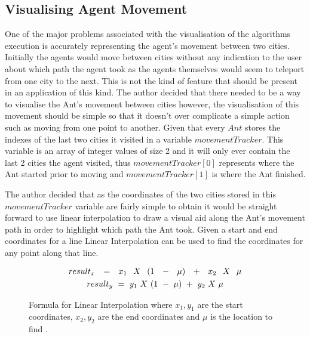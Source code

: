 \subsection{Visualising Agent Movement}
\label{visy}
One of the major problems associated with the visualisation of the algorithms execution is accurately representing the agent’s movement between two cities. Initially the agents would move between cities without any indication to the user about which path the agent took as the agents themselves would seem to teleport from one city to the next. This is not the kind of feature that should be present in an application of this kind. The author decided that there needed to be a way to visualise the Ant’s movement between cities however, the visualisation of this movement should be simple so that it doesn’t over complicate a simple action such as moving from one point to another. Given that every $Ant$ stores the indexes of the last two cities it visited in a variable $movementTracker$. This variable is an array of integer values of size 2 and it will only ever contain the last 2 cities the agent visited, thus $movementTracker[0]$ represents where the Ant started prior to moving and $movementTracker[1]$ is where the Ant finished.

The author decided that as the coordinates of the two cities stored in this $movementTracker$ variable are fairly simple to obtain it would be straight forward to use linear interpolation to draw a visual aid along the Ant's movement path in order to highlight which path the Ant took. Given a start and end coordinates for a line Linear Interpolation can be used to find the coordinates for any point along that line. 

\begin{figure}[H]
\centering
\begin{gather*}
\Huge
result_x\ =\ x_1\ X\ (1\ -\ \mu)\ +\ x_2\ X\ \mu \\
result_y\ =\ y_1\ X\ (1\ -\ \mu)\ +\ y_2\ X\ \mu
\end{gather*}
\caption{Formula for Linear Interpolation where $x_1,y_1$ are the start coordinates, $x_2, y_2$ are the end coordinates and $\mu$ is the location to find \cite{interpolation:site}.}
\label{fig:interPolateEqn}
\end{figure}


